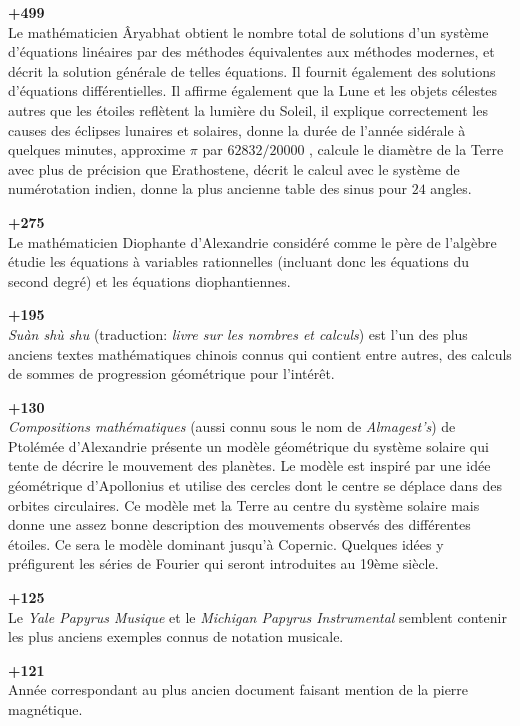 \textbf{+499}\\
Le mathématicien Âryabhat obtient le nombre total de solutions d'un système d'équations linéaires par des méthodes équivalentes aux méthodes modernes, et décrit la solution générale de telles équations. Il fournit également des solutions d'équations différentielles. Il affirme également que la Lune et les objets célestes autres que les étoiles reflètent la lumière du Soleil, il explique correctement les causes des éclipses lunaires et solaires, donne la durée de l'année sidérale à quelques minutes, approxime $\pi$ par $62832/20000$ , calcule le diamètre de la Terre avec plus de précision que Erathostene, décrit le calcul avec le système de numérotation indien, donne la plus ancienne table des sinus pour $24$ angles.

\textbf{+275}\\
Le mathématicien Diophante d'Alexandrie considéré comme le père de l'algèbre étudie les équations à variables rationnelles (incluant donc les équations du second degré) et les équations diophantiennes.

\textbf{+195}\\
\textit{Suàn shù shu} (traduction: \textit{livre sur les nombres et calculs}) est l'un des plus anciens textes mathématiques chinois connus qui contient entre autres, des calculs de sommes de progression géométrique pour l'intérêt.

\textbf{+130}\\
\textit{Compositions mathématiques} (aussi connu sous le nom de \textit{Almagest's}) de Ptolémée d'Alexandrie présente un modèle géométrique du système solaire qui tente de décrire le mouvement des planètes. Le modèle est inspiré par une idée géométrique d'Apollonius et utilise des cercles dont le centre se déplace dans des orbites circulaires. Ce modèle met la Terre au centre du système solaire mais donne une assez bonne description des mouvements observés des différentes étoiles. Ce sera le modèle dominant jusqu'à Copernic. Quelques idées y préfigurent les séries de Fourier qui seront introduites au 19ème siècle.

\textbf{+125}\\
Le \textit{Yale Papyrus Musique} et le \textit{Michigan Papyrus Instrumental} semblent contenir les plus anciens exemples connus de notation musicale.

\textbf{+121}\\
Année correspondant au plus ancien document faisant mention de la pierre magnétique.

